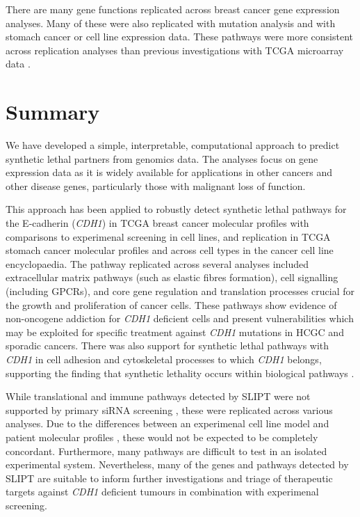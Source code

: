 There are many gene functions replicated across breast cancer gene expression analyses. Many of these were also replicated with mutation analysis and with stomach cancer or cell line expression data. These pathways were more consistent across replication analyses than previous investigations with TCGA microarray data \cite{Kelly2013}.   

\section{Summary}

We have developed a simple, interpretable, computational approach to predict synthetic lethal partners from genomics data. The analyses focus on gene expression data as it is widely available for applications in other cancers and other disease genes, particularly those with malignant loss of function.

This approach has been applied to robustly detect synthetic lethal pathways for the E-cadherin (\textit{CDH1}) in TCGA breast cancer molecular profiles with comparisons to experimenal screening \citep{Telford2015} in cell lines, and replication in TCGA stomach cancer molecular profiles and across cell types in the cancer cell line encyclopaedia. The pathway replicated across several analyses included extracellular matrix pathways (such as elastic fibres formation), cell signalling (including GPCRs), and core gene regulation and translation processes crucial for the growth and proliferation of cancer cells. These pathways show evidence of non-oncogene addiction for \textit{CDH1} deficient cells and present vulnerabilities which may be exploited for specific treatment against \textit{CDH1} mutations in HCGC and sporadic cancers. There was also support for synthetic lethal pathways with \textit{CDH1} in cell adhesion and cytoskeletal processes to which \textit{CDH1} belongs, supporting the finding that synthetic lethality occurs within biological pathways \citep{Kelley2005, Boone2007}.

While translational and immune pathways detected by \gls{SLIPT} were not supported by primary siRNA screening \citep{Telford2015}, these were replicated across various analyses. Due to the differences between an experimenal cell line model \citep{Barretina2012, Chen2014, Fece2015} and patient molecular profiles \citep{TCGA2012, TCGA2014GC}, these would not be expected to be completely concordant. Furthermore, many pathways are difficult to test in an isolated experimental system. Nevertheless, many of the genes and pathways detected by \gls{SLIPT} are suitable to inform further investigations and triage of therapeutic targets against \textit{CDH1} deficient tumours in combination with experimenal screening.  

